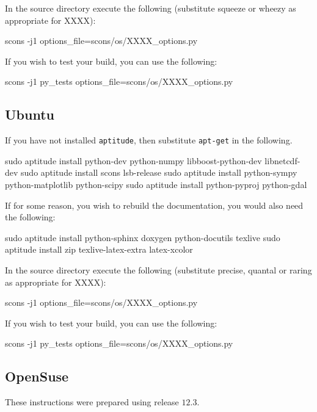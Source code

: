 \noindent In the source directory execute the following (substitute squeeze or wheezy as appropriate for XXXX):
\begin{shellCode}
scons -j1 options_file=scons/os/XXXX_options.py
\end{shellCode}

\noindent If you wish to test your build, you can use the following:
\begin{shellCode}
scons -j1 py_tests options_file=scons/os/XXXX_options.py 
\end{shellCode}

\subsection{Ubuntu}\label{sec:ubsrc}

If you have not installed \texttt{aptitude}, then substitute \texttt{apt-get} in the following.
\begin{shellCode}
sudo aptitude install python-dev python-numpy libboost-python-dev libnetcdf-dev
sudo aptitude install scons lsb-release
sudo aptitude install python-sympy python-matplotlib python-scipy
sudo aptitude install python-pyproj python-gdal 
\end{shellCode}


\begin{optionalstep}
If for some reason, you wish to rebuild the documentation, you would also need the following:
\begin{shellCode}
sudo aptitude install python-sphinx doxygen python-docutils texlive 
sudo aptitude install zip texlive-latex-extra latex-xcolor 
\end{shellCode}
\end{optionalstep}

\noindent In the source directory execute the following (substitute precise, quantal or raring as appropriate for XXXX):
\begin{shellCode}
scons -j1 options_file=scons/os/XXXX_options.py
\end{shellCode}

\noindent If you wish to test your build, you can use the following:
\begin{shellCode}
scons -j1 py_tests options_file=scons/os/XXXX_options.py 
\end{shellCode}



\subsection{OpenSuse}\label{sec:susesrc}
These instructions were prepared using release $12.3$.

